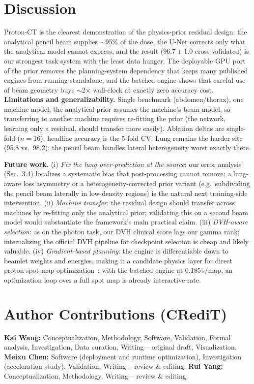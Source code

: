 \documentclass{llncs}
\begin{document}
\section{Discussion}
Proton-CT is the clearest demonstration of the physics-prior residual design: the analytical
pencil beam supplies $\sim$95\% of the dose, the U-Net corrects only what the analytical model
cannot express, and the result ($96.7\pm1.0$ cross-validated) is our strongest task system with
the least data hunger. The deployable GPU port of the prior removes the planning-system
dependency that keeps many published engines from running standalone, and the batched engine
shows that careful use of beam geometry buys $\sim$2$\times$ wall-clock at exactly zero accuracy
cost. \textbf{Limitations and generalizability.} Single benchmark (abdomen/thorax), one machine
model; the analytical prior assumes the machine's beam model, so transferring to another machine
requires re-fitting the prior (the network, learning only a residual, should transfer more
easily). Ablation deltas are single-fold ($n=16$); headline accuracy is the 5-fold CV. Lung
remains the harder site (95.8 vs.\ 98.2): the pencil beam handles lateral heterogeneity worst
exactly there.

\textbf{Future work.} (i) \emph{Fix the lung over-prediction at the source}: our error analysis
(Sec.~3.4) localizes a systematic bias that post-processing cannot remove; a lung-aware loss
asymmetry or a heterogeneity-corrected prior variant (e.g.\ subdividing the pencil beam
laterally in low-density regions) is the natural next training-side intervention. (ii)
\emph{Machine transfer}: the residual design should transfer across machines by re-fitting only
the analytical prior; validating this on a second beam model would substantiate the framework's
main practical claim. (iii) \emph{DVH-aware selection}: as on the photon task, our DVH clinical
score lags our gamma rank; internalizing the official DVH pipeline for checkpoint selection is
cheap and likely valuable. (iv) \emph{Gradient-based planning}: the engine is differentiable
down to beamlet weights and energies, making it a candidate physics layer for direct proton
spot-map optimization~\cite{pydosert,achlatis}; with the batched engine at 0.185\,s/map, an
optimization loop over a full spot map is already interactive-rate.

\section{Author Contributions (CRediT)}
\textbf{Kai Wang:} Conceptualization, Methodology, Software, Validation, Formal analysis,
Investigation, Data curation, Writing -- original draft, Visualization.
\textbf{Meixu Chen:} Software (deployment and runtime optimization), Investigation
(acceleration study), Validation, Writing -- review \& editing.
\textbf{Rui Yang:} Conceptualization, Methodology, Writing -- review \& editing.
\end{document}
